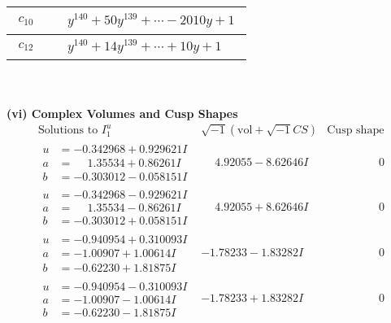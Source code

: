 \documentclass[1p]{elsarticle_modified}
\theoremstyle{definition}
\newcommand{\I}{\sqrt{-1}}
\begin{document}
\begin{tabular}{m{50pt}|m{274pt}}
\hline $$\begin{aligned}c_{10}\end{aligned}$$&$\begin{aligned}
&y^{140}+50 y^{139}+\cdots-2010 y+1
\end{aligned}$\\
\hline $$\begin{aligned}c_{12}\end{aligned}$$&$\begin{aligned}
&y^{140}+14 y^{139}+\cdots+10 y+1
\end{aligned}$\\
\hline
\end{tabular}\\~\\
\newpage\flushleft \textbf{(vi) Complex Volumes and Cusp Shapes}
$$\begin{array}{c|c|c}  
\text{Solutions to }I^u_{1}& \I (\text{vol} + \sqrt{-1}CS) & \text{Cusp shape}\\
 \hline 
\begin{aligned}
u &= -0.342968 + 0.929621 I \\
a &= \phantom{-}1.35534 + 0.86261 I \\
b &= -0.303012 - 0.058151 I\end{aligned}
 & \phantom{-}4.92055 - 8.62646 I & \phantom{-0.000000 } 0 \\ \hline\begin{aligned}
u &= -0.342968 - 0.929621 I \\
a &= \phantom{-}1.35534 - 0.86261 I \\
b &= -0.303012 + 0.058151 I\end{aligned}
 & \phantom{-}4.92055 + 8.62646 I & \phantom{-0.000000 } 0 \\ \hline\begin{aligned}
u &= -0.940954 + 0.310093 I \\
a &= -1.00907 + 1.00614 I \\
b &= -0.62230 + 1.81875 I\end{aligned}
 & -1.78233 - 1.83282 I & \phantom{-0.000000 } 0 \\ \hline\begin{aligned}
u &= -0.940954 - 0.310093 I \\
a &= -1.00907 - 1.00614 I \\
b &= -0.62230 - 1.81875 I\end{aligned}
 & -1.78233 + 1.83282 I & \phantom{-0.000000 } 0 \\ \hline\begin{aligned}

\end{aligned}
\end{array}$$
\end{document}
